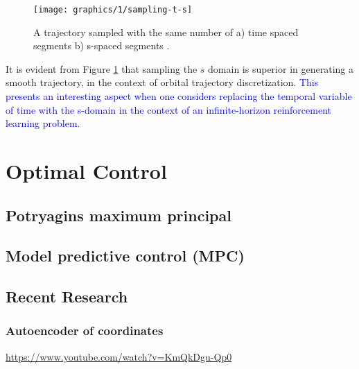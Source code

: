 \begin{figure}[H]
    \centering
    \label{fig:t-s}
    \texttt{[image: graphics/1/sampling-t-s]}
    \caption{
        A trajectory sampled with the same number of a) time spaced segments b)
        s-spaced segments \cite{Yam2010}.
    }
\end{figure}

It is evident from Figure \ref{fig:t-s} that sampling the $s$ domain is superior
in generating a smooth trajectory, in the context of orbital trajectory
discretization. \textcolor{blue}{This presents an interesting aspect when one
considers replacing the temporal variable of time with the s-domain in the
context of an infinite-horizon reinforcement learning problem.}

\section{Optimal Control}

\subsection{Potryagins maximum principal}

\subsection{Model predictive control (MPC)}

\subsection{Recent Research}

\subsubsection{Autoencoder of coordinates}

\url{https://www.youtube.com/watch?v=KmQkDgu-Qp0}
